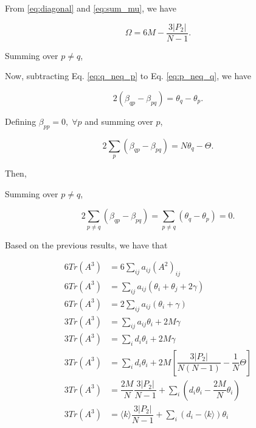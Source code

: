 \documentclass{article}
\begin{document}
From \ref{eq:diagonal} and \ref{eq:sum_mu}, we have 

\begin{equation}
    \Omega = 6M - \dfrac{3 |P_2|}{N-1}.
\end{equation}



Summing over $p\neq q$,



Now, subtracting Eq. \ref{eq:q_neq_p} to Eq. \ref{eq:p_neq_q}, we have

\begin{equation}\label{eq:betas}
     2 (\beta_{qp} - \beta_{pq}) = \theta_q - \theta_p.
\end{equation}

Defining $\beta_{pp} = 0,\;\forall p$ and summing over $p$,

\begin{equation}
    2 \sum_p (\beta_{qp}-\beta_{pq}) = N\theta_q - \Theta.
\end{equation}

Then,


Summing over $p \neq q$,

\begin{equation}
    2 \sum_{p\neq q} (\beta_{qp} - \beta_{pq}) = \sum_{p\neq q} (\theta_q - \theta_p) = 0.
\end{equation}

Based on the previous results, we have that

\begin{align}
    6 Tr(A^3) &= 6 \sum_{ij} a_{ij} (A^2)_{ij} \nonumber \\
    6 Tr(A^3) &= \sum_{ij} a_{ij}(\theta_i + \theta_j + 2\gamma) \nonumber \\
    6 Tr(A^3) &= 2\sum_{ij} a_{ij}(\theta_i + \gamma) \nonumber \\
    3 Tr(A^3) &=  \sum_{i j} a_{ij}\theta_i + 2M\gamma \nonumber \\
    3 Tr(A^3) &=  \sum_{i} d_i\theta_i + 2M\gamma \nonumber \\
    3 Tr(A^3) &= \sum_{i} d_i\theta_i + 2 M \left[\dfrac{3 |P_2|}{N(N-1)} - \dfrac{1}{N} \Theta\right] \nonumber \\
    3 Tr(A^3) &= \dfrac{2 M}{N} \dfrac{3 |P_2|}{N-1} + \sum_{i} \left(d_i\theta_i  - \dfrac{2M}{N}  \theta_i\right) \nonumber \\
    3 Tr(A^3) &= \langle k \rangle \dfrac{3 |P_2|}{N-1} + \sum_{i} \left(d_i -\langle k \rangle\right) \theta_i
\end{align}
\end{document}
